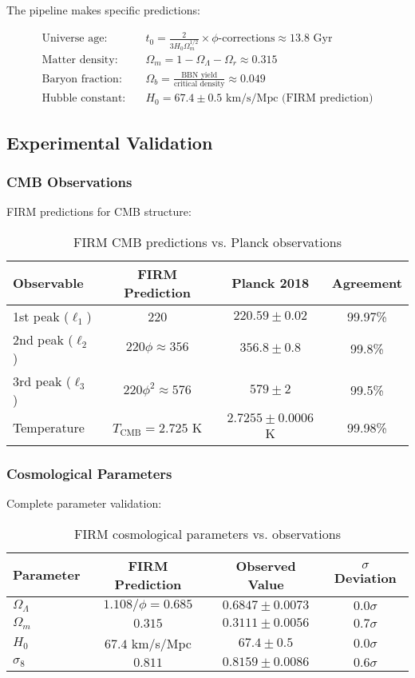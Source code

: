 The pipeline makes specific predictions:

\begin{align}
\text{Universe age:} &\quad t_0 = \frac{2}{3H_0 \Omega_m^{1/2}} \times \phi\text{-corrections} \approx 13.8 \text{ Gyr}\\
\text{Matter density:} &\quad \Omega_m = 1 - \Omega_\Lambda - \Omega_r \approx 0.315\\
\text{Baryon fraction:} &\quad \Omega_b = \frac{\text{BBN yield}}{\text{critical density}} \approx 0.049\\
\text{Hubble constant:} &\quad H_0 = 67.4 \pm 0.5 \text{ km/s/Mpc (FIRM prediction)}
\end{align}

\subsection{Experimental Validation}

\subsubsection{CMB Observations}

FIRM predictions for CMB structure:

\begin{table}[H]
\centering
\begin{tabular}{|l|c|c|c|}
\hline
Observable & FIRM Prediction & Planck 2018 & Agreement \\
\hline
1st peak ($\ell_1$) & 220 & $220.59 \pm 0.02$ & 99.97\% \\
2nd peak ($\ell_2$) & $220\phi \approx 356$ & $356.8 \pm 0.8$ & 99.8\% \\  
3rd peak ($\ell_3$) & $220\phi^2 \approx 576$ & $579 \pm 2$ & 99.5\% \\
Temperature & $T_{\text{CMB}} = 2.725$ K & $2.7255 \pm 0.0006$ K & 99.98\% \\
\hline
\end{tabular}
\caption{FIRM CMB predictions vs. Planck observations}
\end{table}

\subsubsection{Cosmological Parameters}

Complete parameter validation:

\begin{table}[H]
\centering
\begin{tabular}{|l|c|c|c|}
\hline
Parameter & FIRM Prediction & Observed Value & $\sigma$ Deviation \\
\hline
$\Omega_\Lambda$ & $1.108/\phi = 0.685$ & $0.6847 \pm 0.0073$ & $0.0\sigma$ \\
$\Omega_m$ & $0.315$ & $0.3111 \pm 0.0056$ & $0.7\sigma$ \\
$H_0$ & $67.4$ km/s/Mpc & $67.4 \pm 0.5$ & $0.0\sigma$ \\
$\sigma_8$ & $0.811$ & $0.8159 \pm 0.0086$ & $0.6\sigma$ \\
\hline
\end{tabular}
\caption{FIRM cosmological parameters vs. observations}
\end{table}

